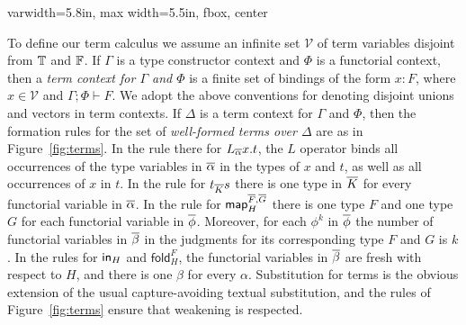 \documentclass{lmcs}
\theoremstyle{plain}\newtheorem{satz}[thm]{Satz}
\newcommand{\fold}{\mathsf{fold}}
\newcommand{\cal}{\mathcal}
\newcommand{\map}{\mathsf{map}}
\begin{document}
{\begin{figure*}
\begin{adjustbox}{varwidth=5.8in, max width=5.5in, fbox, center}
       \vspace*{0.05in}

       \caption{Well-formed terms}\label{fig:terms} \vspace*{-0.00in}
\end{adjustbox}
\end{figure*}

To define our term calculus we assume an infinite set $\cal V$ of term
variables disjoint from $\mathbb{T}$ and $\mathbb{F}$. If $\Gamma$ is a type
constructor context and $\Phi$ is a functorial context, then a {\em
  term context for $\Gamma$ and $\Phi$} is a finite set of bindings of
the form $x : F$, where $x \in {\cal V}$ and $\Gamma; \Phi \vdash
F$. We adopt the above conventions for denoting disjoint unions and
vectors in term contexts. If $\Delta$ is a term context for $\Gamma$
and $\Phi$, then the formation rules for the set of {\em well-formed
  terms over $\Delta$} are as in Figure~\ref{fig:terms}. In the rule
there for $L_{\overline{\alpha}}x.t$, the $L$ operator binds all occurrences
of the type variables in $\overline{\alpha}$ in the types of $x$ and $t$, as
well as all occurrences of $x$ in $t$. In the rule for $t_{\overline{K}} s$
there is one type in $\overline{K}$ for every functorial
variable in $\overline{\alpha}$. In the rule for $\map^{\ol{F},\ol{G}}_H$
there is one type $F$ and one type
$G$ for each functorial variable in $\overline{\phi}$. Moreover, for each
$\phi^k$ in $\overline{\phi}$ the number of functorial variables in $\overline{\beta}$
in the judgments for its corresponding type $F$ and
$G$ is $k$. In the rules for $\mathsf{in}_H$ and $\fold^F_H$, the functorial
variables in $\overline{\beta}$ are fresh with respect to $H$, and there is
one $\beta$ for every $\alpha$. Substitution for terms is the obvious
extension of the usual capture-avoiding textual substitution, and the
rules of Figure~\ref{fig:terms} ensure that weakening is respected.

}
\end{document}
